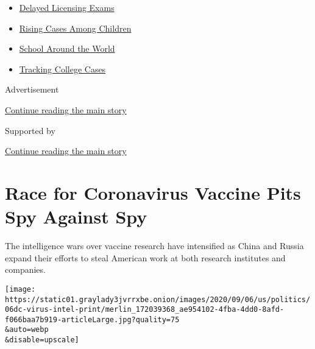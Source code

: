 \begin{itemize}
\tightlist
\item
  \href{https://www.nytimes3xbfgragh.onion/2020/09/04/us/bar-exam-coronavirus.html?name=styln-coronavirus-schools-reopening\&region=TOP_BANNER\&block=storyline_menu_recirc\&action=click\&pgtype=Article\&impression_id=54ca3e31-efb9-11ea-8c1d-cb4966d29e98\&variant=undefined}{Delayed
  Licensing Exams}
\item
  \href{https://www.nytimes3xbfgragh.onion/interactive/2020/08/31/us/coronavirus-cases-children.html?name=styln-coronavirus-schools-reopening\&region=TOP_BANNER\&block=storyline_menu_recirc\&action=click\&pgtype=Article\&impression_id=54ca3e32-efb9-11ea-8c1d-cb4966d29e98\&variant=undefined}{Rising
  Cases Among Children}
\item
  \href{https://www.nytimes3xbfgragh.onion/2020/09/01/world/schools-reopen-globe-students.html?name=styln-coronavirus-schools-reopening\&region=TOP_BANNER\&block=storyline_menu_recirc\&action=click\&pgtype=Article\&impression_id=54ca3e33-efb9-11ea-8c1d-cb4966d29e98\&variant=undefined}{School
  Around the World}
\item
  \href{https://www.nytimes3xbfgragh.onion/interactive/2020/us/covid-college-cases-tracker.html?name=styln-coronavirus-schools-reopening\&region=TOP_BANNER\&block=storyline_menu_recirc\&action=click\&pgtype=Article\&impression_id=54ca3e34-efb9-11ea-8c1d-cb4966d29e98\&variant=undefined}{Tracking
  College Cases}
\end{itemize}

Advertisement

\protect\hyperlink{after-top}{Continue reading the main story}

Supported by

\protect\hyperlink{after-sponsor}{Continue reading the main story}

\hypertarget{race-for-coronavirus-vaccine-pits-spy-against-spy}{%
\section{Race for Coronavirus Vaccine Pits Spy Against
Spy}\label{race-for-coronavirus-vaccine-pits-spy-against-spy}}

The intelligence wars over vaccine research have intensified as China
and Russia expand their efforts to steal American work at both research
institutes and companies.

\texttt{[image: https://static01.graylady3jvrrxbe.onion/images/2020/09/06/us/politics/06dc-virus-intel-print/merlin\_172039368\_ae954102-4fba-4dd0-8afd-f066baa7b919-articleLarge.jpg?quality=75\\\&auto=webp\\\&disable=upscale]}

